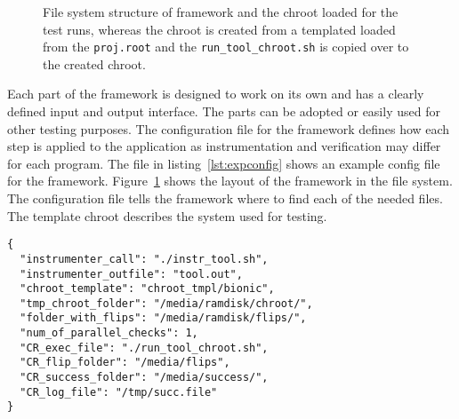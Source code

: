 \begin{figure}
\centering
{}
\caption{File system structure of framework and the chroot loaded for the test
runs, whereas the chroot is created from a templated loaded from the
\texttt{proj.root} and the \texttt{run\_tool\_chroot.sh} is copied over to the
created chroot.}
\label{fig:framfilesys}
\end{figure}

Each part of the framework is designed to work on its own and has a clearly
defined input and output interface. The parts can be adopted or easily used for
other testing purposes. The configuration file for the framework defines how
each step is applied to the application as instrumentation and verification may
differ for each program. The file in listing~\ref{lst:expconfig} shows an
example config file for the framework. Figure~\ref{fig:framfilesys} shows the
layout of the framework in the file system. The configuration file tells the
framework where to find each of the needed files. The template chroot describes
the system used for testing.

\begin{minipage}{\linewidth}
\begin{lstlisting}[style=nasm,
                   caption={JSON style config file for the framework, showing
all parameters used to tweak each part of the framework. Entries
starting with \texttt{CR\_} are used inside the testing \texttt{chroot}.},
                   label={lst:expconfig}]
{
  "instrumenter_call": "./instr_tool.sh",
  "instrumenter_outfile": "tool.out",
  "chroot_template": "chroot_tmpl/bionic",
  "tmp_chroot_folder": "/media/ramdisk/chroot/",
  "folder_with_flips": "/media/ramdisk/flips/",
  "num_of_parallel_checks": 1,
  "CR_exec_file": "./run_tool_chroot.sh",
  "CR_flip_folder": "/media/flips",
  "CR_success_folder": "/media/success/",
  "CR_log_file": "/tmp/succ.file"
}
\end{lstlisting}
\end{minipage}

